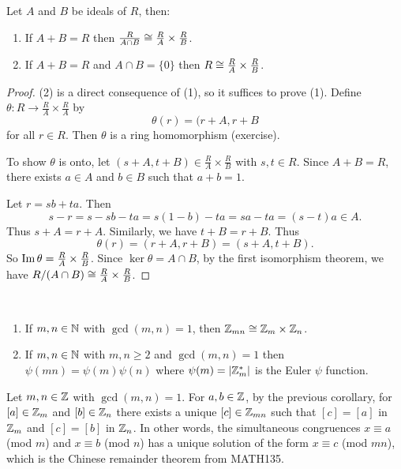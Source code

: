 \documentclass[11pt]{article}
\begin{document}
\begin{theorem}
    Let $A$ and $B$ be ideals of $R$, then:
    \begin{enumerate}
        \item If $A+B=R$ then $\frac{R}{A\cap B}\cong\frac{R}{A}\times\frac{R}{B}$.
        \item If $A+B=R$ and $A\cap B=\{0\}$ then $R\cong\frac{R}{A}\times\frac{R}{B}$.
    \end{enumerate}
\end{theorem}

\begin{proof}
    (2) is a direct consequence of (1), so it suffices to prove (1). Define $\theta:R\to\frac RA\times\frac RA$ by
    \[\theta(r)=(r+A,r+B\]
    for all $r\in R$. Then $\theta$ is a ring homomorphism (exercise).
    
    To show $\theta$ is onto, let $(s+A,t+B)\in\frac RA\times\frac RB$ with $s,t\in R$. Since $A+B=R$, there exists $a\in A$ and $b\in B$ such that $a+b=1$.
    
    Let $r=sb+ta$. Then
    \[s-r=s-sb-ta=s(1-b)-ta=sa-ta=(s-t)a\in A.\]
    Thus $s+A=r+A$. Similarly, we have $t+B=r+B$. Thus
    \[\theta(r)=(r+A,r+B)=(s+A,t+B).\]
    So $\operatorname{Im}\theta=\frac RA\times\frac RB$. Since $\ker\theta=A\cap B$, by the first isomorphism theorem, we have $R/(A\cap B)\cong \frac RA\times\frac RB$.
\end{proof}

\begin{corollary}\,
    \begin{enumerate}
        \item If $m,n\in\mathbb{N}$ with $\gcd(m,n)=1$, then $\mathbb{Z}_{mn}\cong\mathbb{Z}_m\times\mathbb{Z}_n$.
        \item If $m,n\in\mathbb{N}$ with $m,n\geq 2$ and $\gcd(m,n)=1$ then $\psi(mn)=\psi(m)\psi(n)$ where $\psi(m)=|\mathbb{Z}_m^*|$ is the Euler $\psi$ function.
    \end{enumerate}
\end{corollary}

\begin{remark}
    Let $m,n\in\mathbb{Z}$ with $\gcd(m,n)=1$. For $a,b\in\mathbb{Z}$, by the previous corollary, for $[a]\in\mathbb{Z}_m$ and $[b]\in\mathbb{Z}_n$ there exists a unique $[c]\in\mathbb{Z}_{mn}$ such that $[c]=[a]$ in $\mathbb{Z}_m$ and $[c]=[b]$ in $\mathbb{Z}_n$. In other words, the simultaneous congruences $x\equiv a$ (mod $m$) and $x\equiv b$ (mod $n$) has a unique solution of the form $x\equiv c$ (mod $mn$), which is the Chinese remainder theorem from MATH135.
\end{remark}
\end{document}
